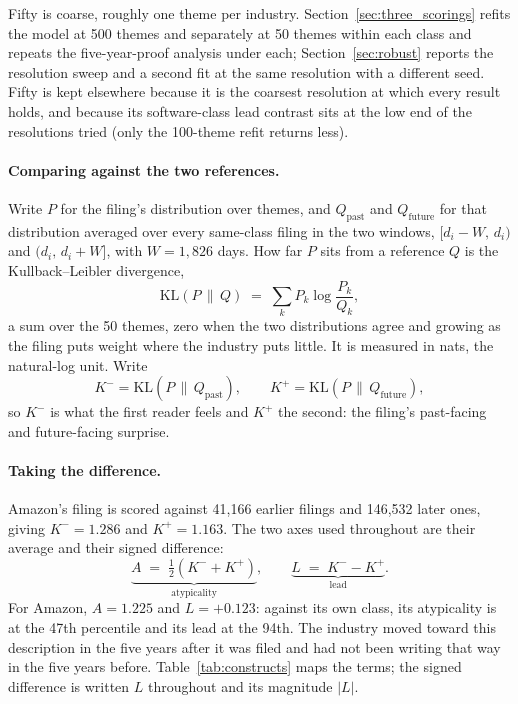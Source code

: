 Fifty is coarse, roughly one theme per industry.
Section~\ref{sec:three_scorings} refits the model at 500 themes and
separately at 50 themes within each class and repeats the five-year-proof
analysis under each; Section~\ref{sec:robust} reports the resolution sweep
and a second fit at the same resolution with a different seed. Fifty is
kept elsewhere because it is the coarsest resolution at which every result
holds, and because its software-class lead contrast sits at the low end of
the resolutions tried (only the 100-theme refit returns less).

\paragraph{Comparing against the two references.} Write $P$ for the filing's
distribution over themes, and $Q_{\mathrm{past}}$ and $Q_{\mathrm{future}}$
for that distribution averaged over every same-class filing in the two
windows, $[d_i - W,\, d_i)$ and $(d_i,\, d_i + W]$, with $W = 1{,}826$ days.
How far $P$ sits from a reference $Q$ is the Kullback--Leibler divergence,
\[
  \mathrm{KL}(P \,\|\, Q) \;=\; \sum_{k} P_k \log \frac{P_k}{Q_k},
\]
a sum over the 50 themes, zero when the two distributions agree and growing as
the filing puts weight where the industry puts little. It is measured in nats,
the natural-log unit. Write
\[
  K^{-} = \mathrm{KL}(P \,\|\, Q_{\mathrm{past}}),
  \qquad
  K^{+} = \mathrm{KL}(P \,\|\, Q_{\mathrm{future}}),
\]
so $K^{-}$ is what the first reader feels and $K^{+}$ the second: the
filing's past-facing and future-facing surprise.

\paragraph{Taking the difference.} Amazon's filing is scored against 41{,}166
earlier filings and 146{,}532 later ones, giving $K^{-} = 1.286$ and
$K^{+} = 1.163$. The two axes used throughout are their average and their
signed difference:
\[
  \underbrace{A \;=\; \tfrac{1}{2}\left(K^{-} + K^{+}\right)}_{\text{atypicality}},
  \qquad
  \underbrace{L \;=\; K^{-} - K^{+}}_{\text{lead}} .
\]
For Amazon, $A = 1.225$ and $L = +0.123$: against its own class, its
atypicality is at the 47th percentile and its lead at the 94th. The
industry moved toward this description in the five years after it was filed
and had not been writing that way in the five years before.
Table~\ref{tab:constructs} maps the terms; the signed difference is written
$L$ throughout and its magnitude $|L|$.

